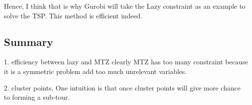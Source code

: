 \documentclass[12pt,letterpaper]{article}
\begin{document}
Hence, I think that is why Gurobi will take the Lazy constraint as an example to solve the TSP.\cite{Gurobi} This method is efficient indeed.

\subsection{Summary}
1. efficiency between lazy and MTZ clearly MTZ has too many constraint because it is a symmetric problem add too much unrelevant variables.

2. cluster points, One intuition is that once cluster points will give more chance to forming a sub-tour.



\end{document}
